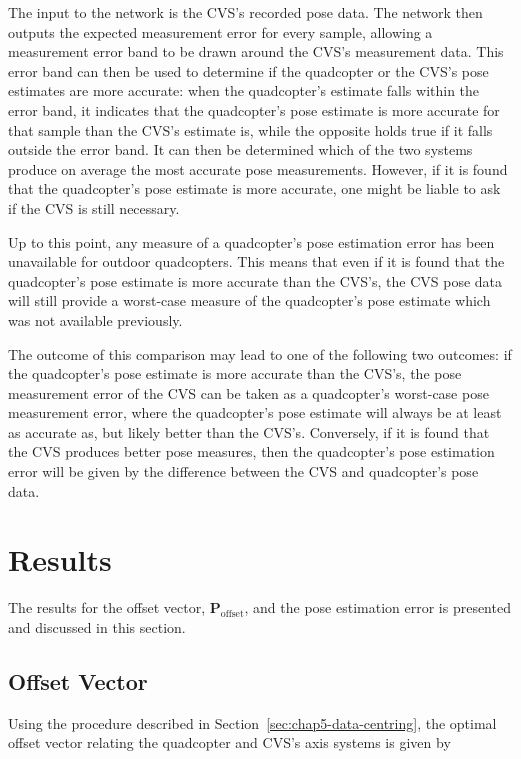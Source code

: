 The input to the network is the CVS's recorded pose data. The network then outputs the expected measurement error for every sample, allowing a measurement error band to be drawn around the CVS's measurement data. This error band can then be used to determine if the quadcopter or the CVS's pose estimates are more accurate: when the quadcopter's estimate falls within the error band, it indicates that the quadcopter's pose estimate is more accurate for that sample than the CVS's estimate is, while the opposite holds true if it falls outside the error band. It can then be determined which of the two systems produce on average the most accurate pose measurements. However, if it is found that the quadcopter's pose estimate is more accurate, one might be liable to ask if the CVS is still necessary.

Up to this point, any measure of a quadcopter's pose estimation error has been unavailable for outdoor quadcopters. This means that even if it is found that the quadcopter's pose estimate is more accurate than the CVS's, the CVS pose data will still provide a worst-case measure of the quadcopter's pose estimate which was not available previously. 

The outcome of this comparison may lead to one of the following two outcomes: if the quadcopter's pose estimate is more accurate than the CVS's, the pose measurement error of the CVS can be taken as a quadcopter's worst-case pose measurement error, where the quadcopter's pose estimate will always be at least as accurate as, but likely better than the CVS's. Conversely, if it is found that the CVS produces better pose measures, then the quadcopter's pose estimation error will be given by the difference between the CVS and quadcopter's pose data. 

\section{Results}

The results for the offset vector, $\bm{P}_{\mathrm{offset}}$, and the pose estimation error is presented and discussed in this section. 

\subsection{Offset Vector}

Using the procedure described in Section~\ref{sec:chap5-data-centring}, the optimal offset vector relating the quadcopter and CVS's axis systems is given by 

